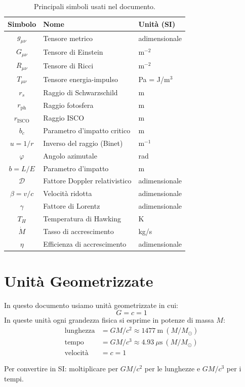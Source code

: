 \documentclass[12pt, a4paper, twoside]{article}
\theoremstyle{definition}
\newcommand{\RS}{r_{\!s}}          %
\newcommand{\Rph}{r_{\!\text{ph}}}  %
\newcommand{\Risco}{r_{\!\text{ISCO}}} %
\newcommand{\bc}{b_{\!c}}          %
\newcommand{\munu}{{\mu\nu}}
\newcommand{\Gmunu}{G_{\munu}}
\newcommand{\Rmunu}{R_{\munu}}
\newcommand{\Tmunu}{T_{\munu}}
\newcommand{\gmunu}{g_{\munu}}
\begin{document}
\begin{table}[h!]
  \centering
  \renewcommand{\arraystretch}{1.4}
  \begin{tabular}{cll}
    \toprule
    \textbf{Simbolo} & \textbf{Nome} & \textbf{Unità (SI)} \\
    \midrule
    $\gmunu$          & Tensore metrico & adimensionale \\
    $\Gmunu$          & Tensore di Einstein & m$^{-2}$ \\
    $\Rmunu$          & Tensore di Ricci & m$^{-2}$ \\
    $\Tmunu$          & Tensore energia-impulso & Pa = J/m$^3$ \\
    $\RS$             & Raggio di Schwarzschild & m \\
    $\Rph$            & Raggio fotosfera & m \\
    $\Risco$          & Raggio ISCO & m \\
    $\bc$             & Parametro d'impatto critico & m \\
    $u = 1/r$         & Inverso del raggio (Binet) & m$^{-1}$ \\
    $\varphi$         & Angolo azimutale & rad \\
    $b = L/E$         & Parametro d'impatto & m \\
    $\mathcal{D}$     & Fattore Doppler relativistico & adimensionale \\
    $\beta = v/c$     & Velocità ridotta & adimensionale \\
    $\gamma$          & Fattore di Lorentz & adimensionale \\
    $T_H$             & Temperatura di Hawking & K \\
    $\dot{M}$         & Tasso di accrescimento & kg/s \\
    $\eta$            & Efficienza di accrescimento & adimensionale \\
    \bottomrule
  \end{tabular}
  \caption{Principali simboli usati nel documento.}
\end{table}

\section{Unità Geometrizzate}

In questo documento usiamo unità geometrizzate in cui:
\begin{equation}
  G = c = 1
\end{equation}
In queste unità ogni grandezza fisica si esprime in potenze di massa $M$:
\begin{align}
  \text{lunghezza} &= GM/c^2 \approx 1477\ \text{m}\ (M/M_\odot) \\
  \text{tempo}     &= GM/c^3 \approx 4.93\ \mu\text{s}\ (M/M_\odot) \\
  \text{velocità}  &= c = 1
\end{align}

Per convertire in SI: moltiplicare per $GM/c^2$ per le lunghezze e $GM/c^3$
per i tempi.
\end{document}
